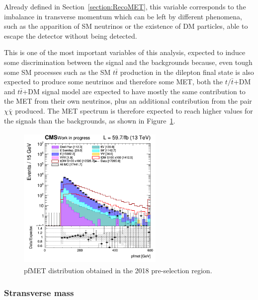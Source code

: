 \documentclass[a4paper, 10pt, openright]{report}
\begin{document}
Already defined in Section~\ref{section:RecoMET}, this variable corresponds to the imbalance in transverse momentum which can be left by different phenomena, such as the apparition of \ac{SM} neutrinos or the existence of \ac{DM} particles, able to escape the detector without being detected.

This is one of the most important variables of this analysis, expected to induce some discrimination between the signal and the backgrounds because, even tough some \ac{SM} processes such as the \ac{SM} $t \bar t$ production in the dilepton final state is also expected to produce some neutrinos and therefore some \ac{MET}, both the $t/ \bar t$+DM and $t \bar t$+DM signal model are expected to have mostly the same contribution to the \ac{MET} from their own neutrinos, plus an additional contribution from the pair $\chi \bar \chi$ produced. The \ac{MET} spectrum is therefore expected to reach higher values for the signals than the backgrounds, as shown in Figure~\ref{fig:SRdiscMET}.


\begin{figure}[htbp]
\centering
\begin{minipage}[b]{.47\textwidth}
\includegraphics[width=7cm, height=7cm]{figs/2018/SmearSR-ttDM-scalar100/log_cratio_topCR_ll_METcorrected_pt.png}
\end{minipage}\hfill
\caption{pf\ac{MET} distribution obtained in the 2018 pre-selection region.}
\label{fig:SRdiscMET}
\end{figure}

\subsubsection*{Stransverse mass}
\end{document}
